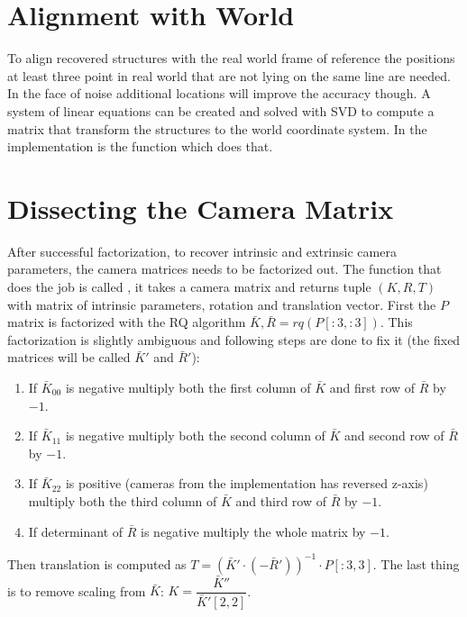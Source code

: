 \documentclass[12pt]{article}
\begin{document}
\section{Alignment with World}

To align recovered structures with the real world frame of reference the
positions at least three point in real world that are not lying on the same line
are needed. In the face of noise additional locations will improve the accuracy
though. A system of linear equations can be created and solved with SVD to
compute a matrix that transform the structures to the world coordinate system.
In the implementation  is the function which
does that.

\section{Dissecting the Camera Matrix}

After successful factorization, to recover intrinsic and extrinsic camera
parameters, the camera matrices needs to be factorized out. The function that
does the job is called , it takes a camera matrix and returns
tuple $(K, R, T)$ with matrix of intrinsic parameters, rotation and translation
vector. First the $P$ matrix is factorized with the RQ algorithm $\bar{K},
\bar{R} = rq(P[:3, :3])$. This factorization is slightly ambiguous and following
steps are done to fix it (the fixed matrices will be called $\bar{K}'$ and
$\bar{R}'$):

\begin{enumerate}
\item If $\bar{K}_{00}$ is negative multiply both the first column of $\bar{K}$ and first row
of $\bar{R}$ by $-1$.
\item If $\bar{K}_{11}$ is negative multiply both the second column of $\bar{K}$ and second row
of $\bar{R}$ by $-1$.
\item If $\bar{K}_{22}$ is positive (cameras from the implementation has reversed z-axis)
multiply both the third column of $\bar{K}$ and third row of $\bar{R}$ by $-1$.
\item If determinant of $\bar{R}$ is negative multiply the whole matrix by $-1$.
\end{enumerate}

Then translation is computed as $T = (\bar{K}' \cdot (-\bar{R}'))^{-1} \cdot
P[:3, 3]$. The  last thing is to remove scaling from $\bar{K}$: $K =
\dfrac{\bar{K}''}{\bar{K}'[2,2]}$.
\end{document}
